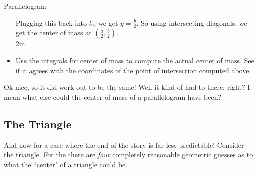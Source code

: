 \begin{exercise}{Parallelogram \Coffeecup \Coffeecup}
\begin{itemize}
{Plugging this back into $l_2$, we get $y=\frac{b}{2}$. So using intersecting diagonals, we get the center of mass at $(\frac{a}{2},\frac{b}{2})$.\\}{2in}

\item Use the integrals for center of mass to compute the actual center of mass.  See if it agrees with the coordinates of the point of intersection computed above.

\solushun{
$$M_y=\int_{x=0}^{x=a}x\left(\frac{b-c}{a}x+c-\frac{b-c}{a}x\right)\dif x=\int_{x=0}^{x=a} xc=\left.\frac{1}{2}cx^2\right|_{x=0}^{x=a}=\frac{1}{2}ca^2$$

\begin{align*}
M_x&=\int_{x=0}^{x=a}\frac{1}{2}\left(\frac{b-c}{a}x+c+\frac{b-c}{a}x\right)\left(\frac{b-c}{a}x+c-\frac{b-c}{a}x\right)\dif x\\
&=\int_{x=0}^{x=a}\frac{1}{2}\left(\frac{2(b-c)}{a}x+c\right)c\dif x\\
&=\int\frac{bc-c^2}{a}x+\frac{1}{2}c^2\dif x\\
&=\left.\frac{bc-c^2}{2a}x^2+\frac{1}{2}xc^2\right]_{x=0}^{x=a}\\
&=\frac{abc-ac^2}{2}+\frac{1}{2}ac^2=\frac{abc}{2}
\end{align*}

\begin{align*}
m=\int_{x=0}^{x=a}\frac{b-c}{a}x+c-\frac{b-c}{a}x\dif x=\int_{x=0}^{x=a} c=\left.cx\right|_{x=0}^{x=a}=ca
\end{align*}

$$\bar{x}=M_y/m = \frac{ca^2}{2ca}=\frac{a}{2}$$
$$\bar{y}=M_x/m = \frac{abc}{2ac}=\frac{b}{2}$$}{3in}
\end{itemize}

\end{exercise}
Ok nice, so it did work out to be the same!  Well it kind of had to there, right?  I mean what else could the center of mass of a parallelogram have been?

\subsection{The Triangle}

And now for a case where the end of the story is far less predictable!  Consider the triangle.  For the  there are \emph{four} completely reasonable geometric guesses as to what the ``center" of a triangle could be.  

